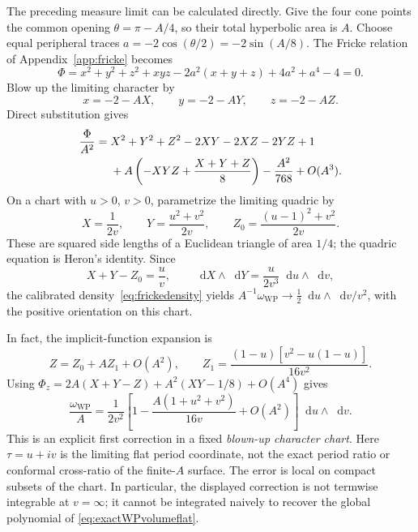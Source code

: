 \documentclass[11pt,a4paper]{article}
\numberwithin{equation}{section}
\theoremstyle{definition}
\theoremstyle{remark}
\newcommand{\dd}{\mathop{}\!\mathrm d}
\newcommand{\WP}{\mathrm{WP}}
\begin{document}
The preceding measure limit can be calculated directly. Give
the four cone points the common opening
$\theta=\pi-A/4$, so their total hyperbolic area is $A$.
Choose equal peripheral traces
$a=-2\cos(\theta/2)=-2\sin(A/8)$. The Fricke relation
of Appendix~\ref{app:fricke} becomes
\begin{equation}
 \Phi=x^2+y^2+z^2+xyz-2a^2(x+y+z)+4a^2+a^4-4=0.
 \label{eq:equalFricke}
\end{equation}
Blow up the limiting character by
\begin{equation}
 x=-2-AX,\qquad y=-2-AY,\qquad z=-2-AZ.
 \label{eq:Frickeblowup}
\end{equation}
Direct substitution gives
\begin{align}
 \frac\Phi{A^2}
  ={}&X^2+Y^2+Z^2-2XY-2XZ-2YZ+1\notag\\
     &+A\left(-XYZ+\frac{X+Y+Z}{8}\right)
       -\frac{A^2}{768}+O(A^3).
 \label{eq:Frickeexpanded}
\end{align}
On a chart with $u>0$, $v>0$, parametrize the limiting quadric by
\begin{equation}
 X=\frac1{2v},\qquad
 Y=\frac{u^2+v^2}{2v},\qquad
 Z_0=\frac{(u-1)^2+v^2}{2v}.
 \label{eq:Frickeperiodchart}
\end{equation}
These are squared side lengths of a Euclidean triangle of area
$1/4$; the quadric equation is Heron's identity. Since
\[
 X+Y-Z_0=\frac uv,\qquad
 \dd X\wedge\dd Y=\frac{u}{2v^3}\dd u\wedge\dd v,
\]
the calibrated density~\eqref{eq:frickedensity} yields
$A^{-1}\omega_{\WP}\to\frac12\dd u\wedge\dd v/v^2$,
with the positive orientation on this chart.

In fact, the implicit-function expansion is
\[
 Z=Z_0+AZ_1+O(A^2),\qquad
 Z_1=\frac{(1-u)[v^2-u(1-u)]}{16v^2}.
\]
Using
$\Phi_z=2A(X+Y-Z)+A^2(XY-1/8)+O(A^4)$ gives
\begin{equation}
 \boxed{\quad
 \frac{\omega_{\WP}}A
  =\frac1{2v^2}\left[
       1-\frac{A(1+u^2+v^2)}{16v}+O(A^2)\right]
                    \dd u\wedge\dd v.
 \quad}
 \label{eq:Frickefirstcorrection}
\end{equation}
This is an explicit first correction in a fixed \emph{blown-up
character chart}. Here $\tau=u+iv$ is the limiting flat period
coordinate, not the exact period ratio or conformal cross-ratio
of the finite-$A$ surface. The error is local on compact subsets
of the chart. In particular, the displayed correction is not
termwise integrable at $v=\infty$; it cannot be integrated
naively to recover the global polynomial of
\eqref{eq:exactWPvolumeflat}.
\end{document}
